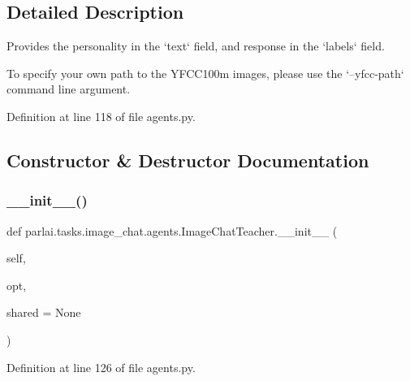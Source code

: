 \subsection{Detailed Description}
\begin{DoxyVerb}Provides the personality in the `text` field, and response in the `labels` field.

To specify your own path to the YFCC100m images, please use the `--yfcc-path`
command line argument.
\end{DoxyVerb}
 

Definition at line 118 of file agents.\+py.



\subsection{Constructor \& Destructor Documentation}
\mbox{\label{classparlai_1_1tasks_1_1image__chat_1_1agents_1_1ImageChatTeacher_a76afe081f47705eb7ec3a5c5c82a1761}} 
\subsubsection{\texorpdfstring{\+\_\+\+\_\+init\+\_\+\+\_\+()}{\_\_init\_\_()}}
{\footnotesize\ttfamily def parlai.\+tasks.\+image\+\_\+chat.\+agents.\+Image\+Chat\+Teacher.\+\_\+\+\_\+init\+\_\+\+\_\+ (\begin{DoxyParamCaption}\item[{}]{self,  }\item[{}]{opt,  }\item[{}]{shared = {\ttfamily None} }\end{DoxyParamCaption})}



Definition at line 126 of file agents.\+py.


